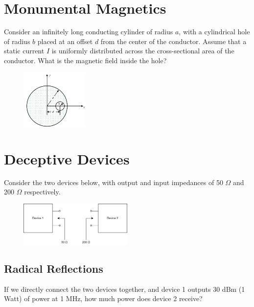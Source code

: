 \documentclass{article}
\begin{document}
\section{Monumental Magnetics}

Consider an infinitely long conducting cylinder of radius $a$, with a cylindrical hole of radius $b$ placed at an offset $d$ from the center of the conductor. Assume that a static current $I$ is uniformly distributed across the cross-sectional area of the conductor. What is the magnetic field inside the hole?

\begin{figure}[H]
\begin{center}
    \includegraphics[width= 0.3\textwidth]{figures/cyl.png}
\end{center}
\end{figure}
\vfill
\newpage

\section{Deceptive Devices}

Consider the two devices below, with output and input impedances of 50 $\Omega$ and 200 $\Omega$ respectively. 

\begin{figure}[H]
\begin{center}
    \includegraphics[width= 0.5\textwidth]{figures/matc.png}
\end{center}
\end{figure}

\subsection{Radical Reflections}
If we directly connect the two devices together, and device 1 outputs 30 dBm (1 Watt) of power at 1 MHz, how much power does device 2 receive?
\end{document}
